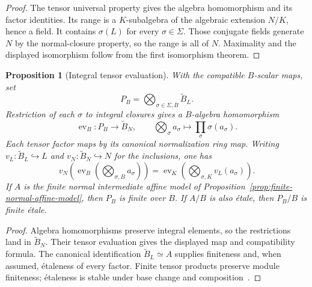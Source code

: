 \documentclass[11pt]{article}
\newtheorem{proposition}[theorem]{Proposition}
\theoremstyle{definition}
\theoremstyle{remark}
\begin{document}
\begin{proof}
The tensor universal property gives the algebra homomorphism and its
factor identities. Its range is a \(K\)-subalgebra of the algebraic
extension \(N/K\), hence a field. It contains \(\sigma(L)\) for every
\(\sigma\in\Sigma\). Those conjugate fields generate \(N\) by the
normal-closure property, so the range is all of \(N\). Maximality and
the displayed isomorphism follow from the first isomorphism theorem.
\end{proof}

\begin{proposition}[Integral tensor evaluation]
\label{prop:normalization-tensor}
With the compatible \(B\)-scalar maps, set
\[
  P_B=\bigotimes_{\sigma\in\Sigma,B}\widetilde B_L.
\]
Restriction of each \(\sigma\) to integral closures gives a
\(B\)-algebra homomorphism
\[
  \operatorname{ev}_B:P_B\longrightarrow\widetilde B_N,
  \qquad \bigotimes_{\sigma}a_\sigma
       \longmapsto\prod_{\sigma}\sigma(a_\sigma).
\]
Each tensor factor maps by its canonical normalization ring map.
Writing \(v_L:\widetilde B_L\hookrightarrow L\) and
\(v_N:\widetilde B_N\hookrightarrow N\) for the inclusions, one has
\[
  v_N\!\left(\operatorname{ev}_B
       \left(\bigotimes_{\sigma,B}a_\sigma\right)\right)
  =\operatorname{ev}_K
       \left(\bigotimes_{\sigma,K}v_L(a_\sigma)\right).
\]
If \(A\) is the finite normal intermediate affine model of
Proposition~\ref{prop:finite-normal-affine-model}, then \(P_B\) is
finite over \(B\). If \(A/B\) is also \'{e}tale, then \(P_B/B\)
is finite \'{e}tale.
\end{proposition}

\begin{proof}
Algebra homomorphisms preserve integral elements, so the restrictions
land in \(\widetilde B_N\). Their tensor evaluation gives the displayed
map and compatibility formula. The canonical identification
\(\widetilde B_L\simeq A\) supplies finiteness and, when assumed,
\'{e}taleness of every factor. Finite tensor products preserve module
finiteness; \'{e}taleness is stable under base change and
composition~\cite{StacksEtaleStability}.
\end{proof}
\end{document}
